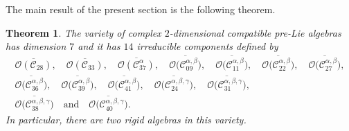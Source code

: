 \documentclass[pdftex]{sigma}
\numberwithin{equation}{section}
\newtheorem{Theorem}{Theorem}[section]
\begin{document}
The main result of the present section is the following theorem.

\begin{Theorem}\label{geo4}
The variety of complex $2$-dimensional compatible pre-Lie algebras has
dimension $7$ and it has $14$ irreducible components defined by
\begin{gather*}
 \overline{\mathcal{O}( \mathcal{C}_{28})} , \quad
 \overline{\mathcal{O}( \mathcal{C}_{33})} , \quad
 \overline{ \mathcal{O}(\mathcal{C}_{37}^\alpha)} ,
\quad \overline{ \mathcal{O}\bigl(\mathcal{C}_{09}^{\alpha,\beta}\bigr)} ,
\quad \overline{ \mathcal{O}\bigl(\mathcal{C}_{11}^{\alpha,\beta}\bigr)} ,
\quad \overline{ \mathcal{O}\bigl(\mathcal{C}_{22}^{\alpha,\beta}\bigr)} ,
\quad\overline{ \mathcal{O}\bigl(\mathcal{C}_{27}^{\alpha,\beta}\bigr)} ,
\\ \overline{ \mathcal{O}\bigl(\mathcal{C}_{36}^{\alpha,\beta}\bigr)} ,
\quad \overline{ \mathcal{O}\bigl(\mathcal{C}_{39}^{\alpha,\beta}\bigr)} ,
\quad \overline{ \mathcal{O}\bigl(\mathcal{C}_{41}^{\alpha,\beta}\bigr)} ,
\quad \overline{ \mathcal{O}\bigl(\mathcal{C}_{24}^{\alpha,\beta,\gamma}\bigr)} ,
\quad \overline{ \mathcal{O}\bigl(\mathcal{C}_{31}^{\alpha,\beta,\gamma}\bigr)} ,
\\ \overline{\mathcal{O}\bigl(\mathcal{C}_{38}^{\alpha,\beta,\gamma}\bigr)} \quad \text{and}
\quad \overline{ \mathcal{O}\bigl(\mathcal{C}_{40}^{\alpha,\beta,\gamma}\bigr)}.
 \end{gather*}
 In particular, there are two rigid algebras in this variety.

\end{Theorem}
\end{document}
